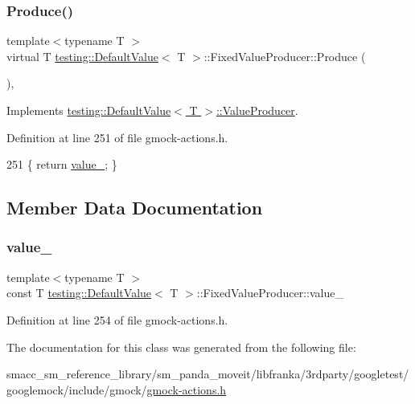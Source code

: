 \subsubsection{\texorpdfstring{Produce()}{Produce()}}
{\footnotesize\ttfamily template$<$typename T $>$ \\
virtual T \hyperlink{classtesting_1_1DefaultValue}{testing\+::\+Default\+Value}$<$ T $>$\+::Fixed\+Value\+Producer\+::\+Produce (\begin{DoxyParamCaption}{ }\end{DoxyParamCaption})\hspace{0.3cm}{\ttfamily [inline]}, {\ttfamily [virtual]}}



Implements \hyperlink{classtesting_1_1DefaultValue_1_1ValueProducer_adb9e38abe068ac2e792b53fd32bd7e96}{testing\+::\+Default\+Value$<$ T $>$\+::\+Value\+Producer}.



Definition at line 251 of file gmock-\/actions.\+h.


\begin{DoxyCode}
251 \{ \textcolor{keywordflow}{return} \hyperlink{classtesting_1_1DefaultValue_1_1FixedValueProducer_a54b7bf74121bd34319ebbe80e1aaa190}{value\_}; \}
\end{DoxyCode}


\subsection{Member Data Documentation}
\mbox{\label{classtesting_1_1DefaultValue_1_1FixedValueProducer_a54b7bf74121bd34319ebbe80e1aaa190}} 
\subsubsection{\texorpdfstring{value\+\_\+}{value\_}}
{\footnotesize\ttfamily template$<$typename T $>$ \\
const T \hyperlink{classtesting_1_1DefaultValue}{testing\+::\+Default\+Value}$<$ T $>$\+::Fixed\+Value\+Producer\+::value\+\_\+\hspace{0.3cm}{\ttfamily [private]}}



Definition at line 254 of file gmock-\/actions.\+h.



The documentation for this class was generated from the following file\+:\begin{DoxyCompactItemize}
\item 
smacc\+\_\+sm\+\_\+reference\+\_\+library/sm\+\_\+panda\+\_\+moveit/libfranka/3rdparty/googletest/googlemock/include/gmock/\hyperlink{gmock-actions_8h}{gmock-\/actions.\+h}\end{DoxyCompactItemize}
